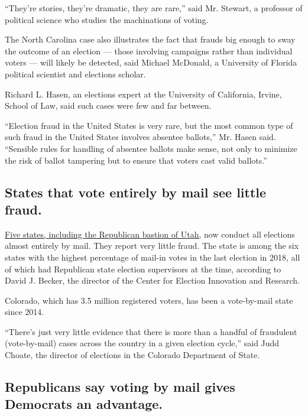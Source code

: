 ``They're stories, they're dramatic, they are rare,'' said Mr. Stewart,
a professor of political science who studies the machinations of voting.

The North Carolina case also illustrates the fact that frauds big enough
to sway the outcome of an election --- those involving campaigns rather
than individual voters --- will likely be detected, said Michael
McDonald, a University of Florida political scientist and elections
scholar.

Richard L. Hasen, an elections expert at the University of California,
Irvine, School of Law, said such cases were few and far between.

``Election fraud in the United States is very rare, but the most common
type of such fraud in the United States involves absentee ballots,'' Mr.
Hasen said. ``Sensible rules for handling of absentee ballots make
sense, not only to minimize the risk of ballot tampering but to ensure
that voters cast valid ballots.''

\hypertarget{states-that-vote-entirely-by-mail-see-little-fraud}{%
\subsection{States that vote entirely by mail see little
fraud.}\label{states-that-vote-entirely-by-mail-see-little-fraud}}

\href{https://www.ncsl.org/research/elections-and-campaigns/all-mail-elections.aspx}{Five
states, including the Republican bastion of Utah,} now conduct all
elections almost entirely by mail. They report very little fraud. The
state is among the six states with the highest percentage of mail-in
votes in the last election in 2018, all of which had Republican state
election supervisors at the time, according to David J. Becker, the
director of the Center for Election Innovation and Research.

Colorado, which has 3.5 million registered voters, has been a
vote-by-mail state since 2014.

``There's just very little evidence that there is more than a handful of
fraudulent (vote-by-mail) cases across the country in a given election
cycle,'' said Judd Choate, the director of elections in the Colorado
Department of State.

\hypertarget{republicans-say-voting-by-mail-gives-democrats-an-advantage}{%
\subsection{Republicans say voting by mail gives Democrats an
advantage.}\label{republicans-say-voting-by-mail-gives-democrats-an-advantage}}

